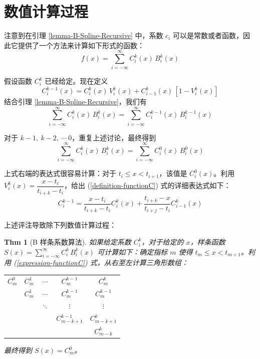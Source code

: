 \documentclass[a4paper]{article}
\newtheorem{theorem}{Thm}
\begin{document}
\section{数值计算过程}

    注意到在引理 \ref{lemma-B-Spline-Recursive} 中，系数 $c_i$ 可以是常数或者函数，因此它提供了一个方法来计算如下形式的函数：
    \begin{equation*}
        f(x) = \sum_{i = -\infty}^{\infty} C_i^k(x)\,B_i^k(x)
    \end{equation*}

    \noindent 假设函数 $C_i^k$ 已经给定。现在定义
    \begin{equation}
    \label{definition-functionC}
        C_{i}^{k-1}(x) = C_{i}^{k}(x)\,V_{i}^{k}(x) + C_{i-1}^{k}(x)\,[1 - V_{i}^{k}(x)]
    \end{equation}
    结合引理 \ref{lemma-B-Spline-Recursive}，我们有
    \begin{equation*}
        \sum_{i = -\infty}^{\infty} C_{i}^{k}(x)\,B_{i}^{k}(x) = \sum_{i = -\infty}^{\infty} C_{i}^{k-1}(x)\,B_{i}^{k-1}(x)
    \end{equation*}

    \noindent 对于 $k-1,\ k-2,\ \cdots\ 0$，重复上述讨论，最终得到
    \begin{equation*}
        \sum_{i = -\infty}^{\infty} C_i^k(x)\,B_i^k(x) = \sum_{i = -\infty}^{\infty} C_i^0(x)\,B_i^0(x)
    \end{equation*}

    上式右端的表达式很容易计算：对于 $t_{i} \leqslant x < t_{i+1}$，该值是 $C_i^0(x)$。利用 $ V_i^k(x) = \dfrac{x - t_{i}}{t_{i+k} - t_{i}}$，给出 (\ref{definition-functionC}) 式的详细表达式如下：
    \begin{equation}
    \label{expression-functionC}
        C_{i}^{k-1} = \frac{x - t_{i}}{t_{i+k} - t_{i}} C_{i}^{k}(x) + \frac{t_{i+k} - x}{t_{i+j} - t_{i}} C_{i-1}^{k}(x)
    \end{equation}

    上述评注导致除下列数值计算过程：
    \begin{theorem}[B 样条系数算法]
        如果给定系数 $C_i^k$，对于给定的 $x$，样条函数 $S(x) = \displaystyle\sum_{i = -\infty}^{\infty} C_i^k\,B_i^k(x)$ 可计算如下：确定指标 $m$ 使得 $t_{m} \leqslant x < t_{m+1}$。利用 (\ref{expression-functionC}) 式，从右至左计算三角形数组：
        \begin{table}[htb]
            \centering
            \begin{tabular}{ccccc}
                $C_{m}^{0}$ & $C_{m}^{1}$ & $\cdots$ & $C_{m}^{k-1}$ & $C_{m}^{k}$ \\
                & $C_{m}^{1}$ & $\cdots$ & $C_{m}^{k-1}$ & $C_{m}^{k-1}$ \\
                & & $\ddots$ & $\vdots$ & $\vdots$ \\
                & & & $C_{m-k+1}^{k-1}$ & $C_{m-k+1}^{k}$ \\
                & & & & $C_{m-k}^{k}$ \\
            \end{tabular}
        \end{table}
        最终得到 $S(x) = C_m^0$。
    \end{theorem}
    
\end{document}
